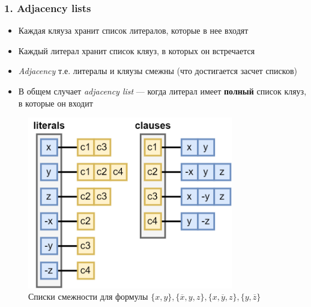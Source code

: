 \documentclass[aspectratio=169,xcolor=table,english]{beamer}
\begin{document}
\begin{frame}[fragile] \frametitle{1. Adjacency lists}
    \begin{minipage}[m]{0.5\linewidth}
        \begin{itemize}
            \item Каждая кляуза хранит список литералов, которые в нее входят
            \item Каждый литерал хранит список кляуз, в которых он встречается
            \item \textit{Adjacency} т.е. литералы и кляузы смежны (что достигается засчет списков)
            \item В общем случает \textit{adjacency list} --- когда литерал имеет \textbf{полный} список кляуз, в которые он входит
        \end{itemize}
    \end{minipage}\hfill
    \begin{minipage}[m]{0.45\linewidth}
        \begin{figure}
            \centering
            \includegraphics[width=0.8\textwidth]{figures/adjacency lists.png}
            \caption{Списки смежности для формулы $\{x,y\},\{\overline{x},y,z\},\{x,\overline{y},z\},\{y,\overline{z}\}$}
        \end{figure}
    \end{minipage}
\end{frame}
\end{document}
